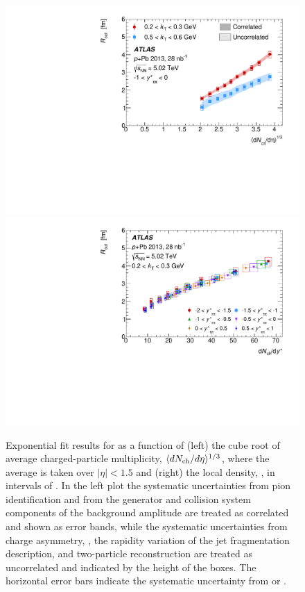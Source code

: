 \begin{figure}[ht]
\centering
\includegraphics[width=0.49\linewidth]{canqosl_Rout_vs_avg_mult.pdf}
\includegraphics[width=0.49\linewidth]{canqosl_Rout_kt1_vs_mult.pdf}
\caption{Exponential fit results for \Rout as a function of (left) the cube root of average charged-particle multiplicity, $\langle d\mbox{$N_{\mathrm{ch}}$}/d\eta\rangle^{1/3}$, where the average is taken over $|\eta| < 1.5$ and (right) the local density, \dNdy, in intervals of \kys. In the left plot the systematic uncertainties from pion identification and from the generator and collision system components of the background amplitude are treated as correlated and shown as error bands, while the systematic uncertainties from charge asymmetry, \Reff, the rapidity variation of the jet fragmentation description, and two-particle reconstruction are treated as uncorrelated and indicated by the height of the boxes. The horizontal error bars indicate the systematic uncertainty from \avgdNdeta or \dNdy.}
\label{fig:results_Rout_mult}
\end{figure}

